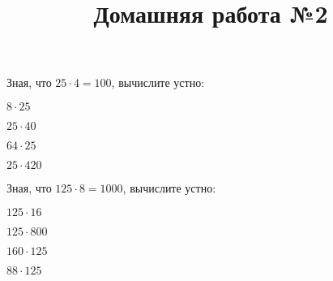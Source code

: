 \begin{listofex}
	\item Зная, что \( 25\cdot4=100 \), вычислите устно:
	\begin{enumcols}[itemcolumns=4]
		\item \( 8\cdot25 \)
		\item \( 25\cdot40 \)
		\item \( 64\cdot25 \)
		\item \( 25\cdot420 \)
	\end{enumcols}
	\item Зная, что \( 125\cdot8=1000 \), вычислите устно:
	\begin{enumcols}[itemcolumns=4]
		\item \( 125\cdot16 \)
		\item \( 125\cdot800 \)
		\item \( 160\cdot125 \)
		\item \( 88\cdot125 \)
	\end{enumcols}
\end{listofex}
\newpage
\title{Домашняя работа №2}
